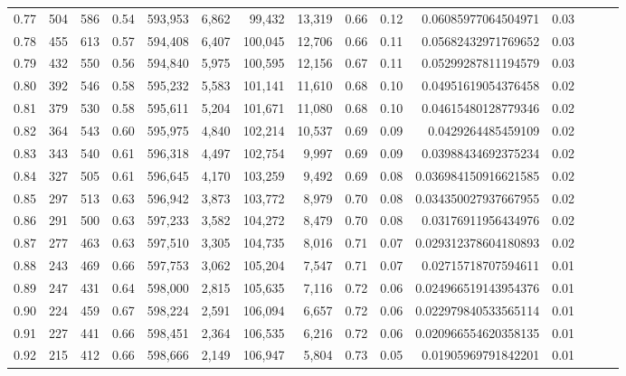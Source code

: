 \begin{tabular}{rrrrrrrrrrrrrrr}
0.77 &     504 &    586 &  0.54 &  593,953 &    6,862 &   99,432 &   13,319 &  0.66 &  0.12 &   0.06085977064504971 &      0.03 \\
0.78 &     455 &    613 &  0.57 &  594,408 &    6,407 &  100,045 &   12,706 &  0.66 &  0.11 &   0.05682432971769652 &      0.03 \\
0.79 &     432 &    550 &  0.56 &  594,840 &    5,975 &  100,595 &   12,156 &  0.67 &  0.11 &   0.05299287811194579 &      0.03 \\
0.80 &     392 &    546 &  0.58 &  595,232 &    5,583 &  101,141 &   11,610 &  0.68 &  0.10 &   0.04951619054376458 &      0.02 \\
0.81 &     379 &    530 &  0.58 &  595,611 &    5,204 &  101,671 &   11,080 &  0.68 &  0.10 &   0.04615480128779346 &      0.02 \\
0.82 &     364 &    543 &  0.60 &  595,975 &    4,840 &  102,214 &   10,537 &  0.69 &  0.09 &    0.0429264485459109 &      0.02 \\
0.83 &     343 &    540 &  0.61 &  596,318 &    4,497 &  102,754 &    9,997 &  0.69 &  0.09 &   0.03988434692375234 &      0.02 \\
0.84 &     327 &    505 &  0.61 &  596,645 &    4,170 &  103,259 &    9,492 &  0.69 &  0.08 &  0.036984150916621585 &      0.02 \\
0.85 &     297 &    513 &  0.63 &  596,942 &    3,873 &  103,772 &    8,979 &  0.70 &  0.08 &  0.034350027937667955 &      0.02 \\
0.86 &     291 &    500 &  0.63 &  597,233 &    3,582 &  104,272 &    8,479 &  0.70 &  0.08 &   0.03176911956434976 &      0.02 \\
0.87 &     277 &    463 &  0.63 &  597,510 &    3,305 &  104,735 &    8,016 &  0.71 &  0.07 &  0.029312378604180893 &      0.02 \\
0.88 &     243 &    469 &  0.66 &  597,753 &    3,062 &  105,204 &    7,547 &  0.71 &  0.07 &   0.02715718707594611 &      0.01 \\
0.89 &     247 &    431 &  0.64 &  598,000 &    2,815 &  105,635 &    7,116 &  0.72 &  0.06 &  0.024966519143954376 &      0.01 \\
0.90 &     224 &    459 &  0.67 &  598,224 &    2,591 &  106,094 &    6,657 &  0.72 &  0.06 &  0.022979840533565114 &      0.01 \\
0.91 &     227 &    441 &  0.66 &  598,451 &    2,364 &  106,535 &    6,216 &  0.72 &  0.06 &  0.020966554620358135 &      0.01 \\
0.92 &     215 &    412 &  0.66 &  598,666 &    2,149 &  106,947 &    5,804 &  0.73 &  0.05 &   0.01905969791842201 &      0.01 \\

\end{tabular}
